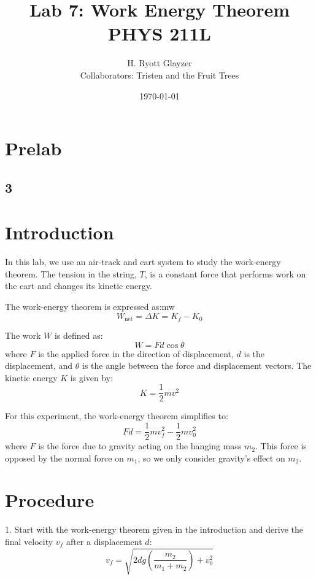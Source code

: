 \documentclass[hidelinks, 12pt, letterpaper]{article}
\title{\textbf{Lab 7:  Work Energy Theorem}\\PHYS 211L}
\author{H. Ryott Glayzer\\Collaborators: Tristen and the Fruit Trees}
\date{\today}
\begin{document}
\hypersetup{bookmarksnumbered=true,}

\maketitle

\begin{Large}
\tableofcontents
\end{Large}%
\pagebreak

\section*{Prelab}
\subsection*{3}

\section{Introduction}
In this lab, we use an air-track and cart system to study the work-energy theorem. The tension in the string, $T$, is a constant force that performs work on the cart and changes its kinetic energy.

The work-energy theorem is expressed as:mw
\begin{equation}
W_{\text{net}} = \Delta K = K_f - K_0
\end{equation}

The work $W$ is defined as:
\begin{equation}
W = F d \cos \theta
\end{equation}
where $F$ is the applied force in the direction of displacement, $d$ is the displacement, and $\theta$ is the angle between the force and displacement vectors. The kinetic energy $K$ is given by:
\begin{equation}
K = \frac{1}{2} m v^2
\end{equation}

For this experiment, the work-energy theorem simplifies to:
\begin{equation}
F d = \frac{1}{2} m v_f^2 - \frac{1}{2} m v_0^2
\end{equation}
where $F$ is the force due to gravity acting on the hanging mass $m_2$. This force is opposed by the normal force on $m_1$, so we only consider gravity's effect on $m_2$.

\section{Procedure}
1. Start with the work-energy theorem given in the introduction and derive the final velocity $v_f$ after a displacement $d$:
\begin{equation}
    v_f = \sqrt{2dg \left( \frac{m_2}{m_1 + m_2} \right) + v_0^2}
\end{equation}
\end{document}
